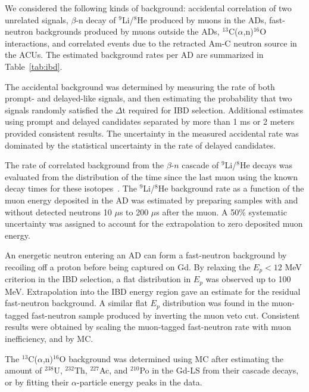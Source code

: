 \documentclass[aps,prl,showpacs,showkeys,amsmath,amssymb,
twocolumn,
floatfix,
superscriptaddress
]{revtex4-1}
\begin{document}
\par
We considered the following kinds of background: accidental correlation of two unrelated signals,
$\beta$-n decay of $^9$Li/$^8$He produced by muons in the ADs, fast-neutron backgrounds produced by muons outside the ADs, $^{13}$C($\alpha$,n)$^{16}$O interactions, and
correlated events due to the retracted Am-C neutron source in the ACUs.
The estimated background rates per AD are summarized in Table~\ref{tab:ibd}.


\par
The accidental background was determined by measuring the
rate of both prompt- and delayed-like signals, and then estimating
the probability that two signals randomly satisfied the $\Delta$t required for IBD
selection. Additional estimates using prompt and delayed candidates separated by more than 1 ms or 2 meters provided consistent results. The uncertainty in the measured accidental rate was dominated by
the statistical uncertainty in the rate of delayed candidates.

\par
The rate of correlated background from the $\beta$-$n$ cascade of
$^9$Li/$^8$He decays was evaluated from the distribution of the time since the last
muon using the known decay times for these isotopes~\cite{wenljnim}.
The $^9$Li/$^8$He background rate as a function of the muon energy deposited in the
AD was estimated by preparing samples with and without detected neutrons 10 $\mu$s to 200 $\mu$s after the muon. A 50\% systematic uncertainty was assigned to account for the extrapolation to zero deposited muon energy.


\par
An energetic neutron entering an AD can form a fast-neutron background by recoiling off
a proton before being captured on Gd.  By relaxing the $E_p\!<\!12$ MeV criterion in the IBD selection, a flat distribution in $E_p$ was observed up to 100 MeV\@. Extrapolation into the IBD energy region gave an estimate for the residual fast-neutron background.
A similar flat $E_p$ distribution
was found in the muon-tagged fast-neutron sample produced by inverting the muon veto cut. Consistent results were obtained by scaling the muon-tagged fast-neutron rate with muon inefficiency, and by MC\@.

\par
The $^{13}$C($\alpha$,n)$^{16}$O background was determined using MC after estimating the amount of $^{238}$U, $^{232}$Th, $^{227}$Ac, and $^{210}$Po in the Gd-LS from their cascade decays, or by fitting their $\alpha$-particle energy peaks in the data.
\end{document}
